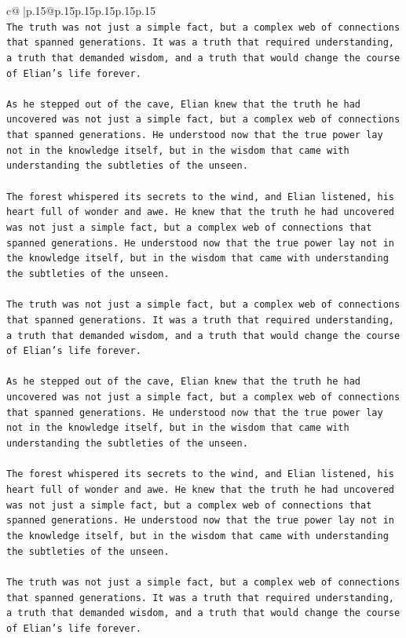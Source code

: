\documentclass{article}
\begin{document}
{\begin{supertabular}{c@{$\;$}|p{.15\linewidth}@{}p{.15\linewidth}p{.15\linewidth}p{.15\linewidth}p{.15\linewidth}p{.15\linewidth}}
{{{\\ 
\texttt{The truth was not just a simple fact, but a complex web of connections that spanned generations. It was a truth that required understanding, a truth that demanded wisdom, and a truth that would change the course of Elian's life forever.} \\
\\ 
\texttt{As he stepped out of the cave, Elian knew that the truth he had uncovered was not just a simple fact, but a complex web of connections that spanned generations. He understood now that the true power lay not in the knowledge itself, but in the wisdom that came with understanding the subtleties of the unseen.} \\
\\ 
\texttt{The forest whispered its secrets to the wind, and Elian listened, his heart full of wonder and awe. He knew that the truth he had uncovered was not just a simple fact, but a complex web of connections that spanned generations. He understood now that the true power lay not in the knowledge itself, but in the wisdom that came with understanding the subtleties of the unseen.} \\
\\ 
\texttt{The truth was not just a simple fact, but a complex web of connections that spanned generations. It was a truth that required understanding, a truth that demanded wisdom, and a truth that would change the course of Elian's life forever.} \\
\\ 
\texttt{As he stepped out of the cave, Elian knew that the truth he had uncovered was not just a simple fact, but a complex web of connections that spanned generations. He understood now that the true power lay not in the knowledge itself, but in the wisdom that came with understanding the subtleties of the unseen.} \\
\\ 
\texttt{The forest whispered its secrets to the wind, and Elian listened, his heart full of wonder and awe. He knew that the truth he had uncovered was not just a simple fact, but a complex web of connections that spanned generations. He understood now that the true power lay not in the knowledge itself, but in the wisdom that came with understanding the subtleties of the unseen.} \\
\\ 
\texttt{The truth was not just a simple fact, but a complex web of connections that spanned generations. It was a truth that required understanding, a truth that demanded wisdom, and a truth that would change the course of Elian's life forever.} \\
}}}
\end{supertabular}}
\end{document}
